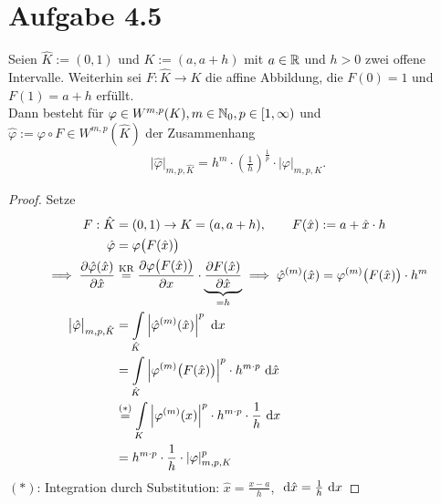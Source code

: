 \documentclass[12pt,a4paper]{article}
\begin{document}
\section*{Aufgabe 4.5}
Seien $\hat{K}:=(0,1)$ und $K:=(a,a+h)$ mit $a\in\mathbb{R}$ und $h>0$ zwei offene Intervalle. Weiterhin sei $F:\hat{K}\to K$ die affine Abbildung, die $F(0)=1$ und $F(1)=a+h$ erfüllt.\\
Dann besteht für $\varphi\in W^{m,p}(K),m\in\mathbb{N}_0,p\in[1,\infty)$ und\\ $\hat{\varphi}:=\varphi\circ F\in W^{m,p}(\hat{K})$ der Zusammenhang
\begin{align*}
\big|\hat{\varphi}\big|_{m,p,\hat{K}}=h^m\cdot \left(\frac{1}{h}\right)^{\frac{1}{p}}\cdot|\varphi|_{m,p,K}.
\end{align*}
\begin{proof}
Setze
\begin{align*}
F:\hat{K}&=(0,1)\to K=(a,a+h),\qquad F(\hat{x}):=a+\hat{x}\cdot h\\
\hat{\varphi}&=\varphi\big(F(\hat{x})\big)\\
\implies
\frac{\partial\hat{\varphi}(\hat{x})}{\partial\hat{x}}&\stackrel{\text{KR}}{=}\frac{\partial\varphi\big(F(\hat{x})\big)}{\partial x}\cdot\underbrace{\frac{\partial F(\hat{x})}{\partial\hat{ x}}}_{=h}
\implies
\hat{\varphi}^{(m)}(\hat{x})=\varphi^{(m)}\big(F(\hat{x})\big)\cdot h^m\\
\big|\hat{\varphi}\big|_{m,p,\hat{K}}
&=\int\limits_{\hat{K}}\left|\hat{\varphi}^{(m)}(\hat{x})\right|^p\text{ d} x\\
&=\int\limits_{\hat{K}}\left|\varphi^{(m)}\big(F(\hat{x})\big)\right|^p\cdot h^{m\cdot p}\text{ d}\hat{x}\\
&\stackrel{(\ast)}{=}
\int\limits_K\left|\varphi^{(m)}(x)\right|^p\cdot h^{m\cdot p}\cdot\frac{1}{h}\text{ d} x\\
&=h^{m\cdot p}\cdot\frac{1}{h}\cdot|\varphi|^p_{m,p,K}
\end{align*}
$(\ast)$: Integration durch Substitution: $\hat{x}=\frac{x-a}{h}$, $\text{ d}\hat{x}=\frac{1}{h}\text{ d} x$
\end{proof}
\end{document}
